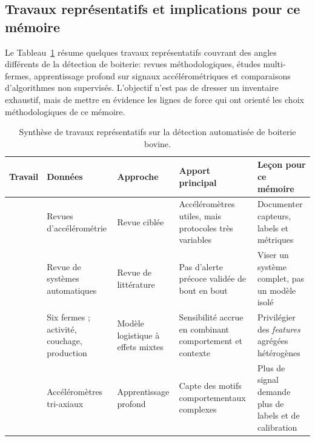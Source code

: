 \subsection{Travaux représentatifs et implications pour ce mémoire}
Le Tableau~\ref{tab:revue_comparee} résume quelques travaux représentatifs couvrant des
angles différents de la détection de boiterie: revues méthodologiques, études multi-fermes,
apprentissage profond sur signaux accélérométriques et comparaisons d'algorithmes non
supervisés. L'objectif n'est pas de dresser un inventaire exhaustif, mais de mettre en
évidence les lignes de force qui ont orienté les choix méthodologiques de ce mémoire.

\begin{table}[H]
    \centering
    \small
    \caption{Synthèse de travaux représentatifs sur la détection automatisée de boiterie
    bovine.}
    \label{tab:revue_comparee}
    \begin{tabular}{>{\raggedright\arraybackslash}p{2.8cm}
                    >{\raggedright\arraybackslash}p{2.4cm}
                    >{\raggedright\arraybackslash}p{2.7cm}
                    >{\raggedright\arraybackslash}p{3.1cm}
                    >{\raggedright\arraybackslash}p{3.2cm}}
        \toprule
        \textbf{Travail} & \textbf{Données} & \textbf{Approche} & \textbf{Apport principal} & \textbf{Leçon pour ce mémoire} \\
        \midrule
        \citet{oleary2020accelerometers}
        & Revues d'accélérométrie
        & Revue ciblée
        & Accéléromètres utiles, mais protocoles très variables
        & Documenter capteurs, labels et métriques \\
        \addlinespace
        \citet{alsaaod2019automatic}
        & Revue de systèmes automatiques
        & Revue de littérature
        & Pas d'alerte précoce validée de bout en bout
        & Viser un système complet, pas un modèle isolé \\
        \addlinespace
        \citet{lavrova2023lameness}
        & Six fermes ; activité, couchage, production
        & Modèle logistique à effets mixtes
        & Sensibilité accrue en combinant comportement et contexte
        & Privilégier des \textit{features} agrégées hétérogènes \\
        \addlinespace
        \citet{balasso2023behaviour}
        & Accéléromètres tri-axiaux
        & Apprentissage profond
        & Capte des motifs comportementaux complexes
        & Plus de signal demande plus de labels et de calibration \\

\end{tabular}
\end{table}
